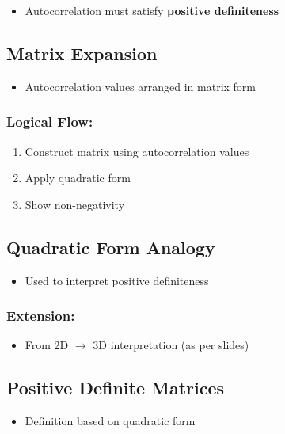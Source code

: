 \documentclass[12pt]{article}
\begin{document}
\begin{itemize}
    \item Autocorrelation must satisfy \textbf{positive definiteness}
\end{itemize}

\subsection{Matrix Expansion}

\begin{itemize}
    \item Autocorrelation values arranged in matrix form
\end{itemize}

\subsubsection*{Logical Flow:}

\begin{enumerate}
    \item Construct matrix using autocorrelation values
    \item Apply quadratic form
    \item Show non-negativity
\end{enumerate}

\subsection{Quadratic Form Analogy}

\begin{itemize}
    \item Used to interpret positive definiteness
\end{itemize}

\subsubsection*{Extension:}

\begin{itemize}
    \item From 2D $\rightarrow$ 3D interpretation (as per slides)
\end{itemize}

\subsection{Positive Definite Matrices}

\begin{itemize}
    \item Definition based on quadratic form
\end{itemize}
\end{document}
